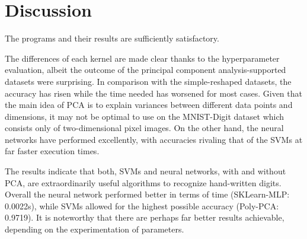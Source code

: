 \chapter{Discussion}
The programs and their results are sufficiently satisfactory.

The differences of each kernel are made clear thanks to the hyperparameter evaluation, albeit the outcome of the principal component analysis-supported datasets were surprising.
In comparison with the simple-reshaped datasets, the accuracy has risen while the time needed has worsened for most cases.
Given that the main idea of PCA is to explain variances between different data points and dimensions, it may not be optimal to use on the MNIST-Digit dataset which consists only of two-dimensional pixel images.
On the other hand, the neural networks have performed excellently, with accuracies rivaling that of the SVMs at far faster execution times. 

The results indicate that both, SVMs and neural networks, with and without PCA, are extraordinarily useful algorithms to recognize hand-written digits.
Overall the neural network performed better in terms of time (SKLearn-MLP: 0.0022s), while SVMs allowed for the highest possible accuracy (Poly-PCA: 0.9719).
It is noteworthy that there are perhaps far better results achievable, depending on the experimentation of parameters.
